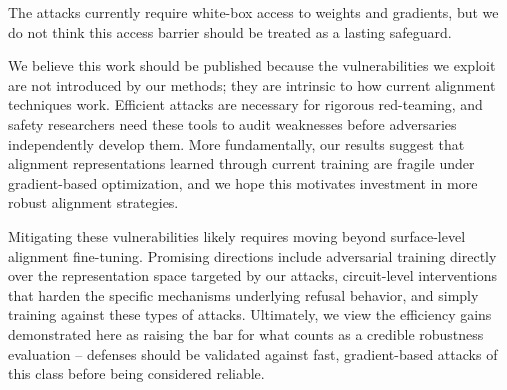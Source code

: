 \documentclass[letterpaper]{article} %
\begin{document}
The attacks currently require white-box access to weights and gradients, but we do not think this access barrier should be treated as a lasting safeguard.

We believe this work should be published because the vulnerabilities we exploit are not introduced by our methods; they are intrinsic to how current alignment techniques work. Efficient attacks are necessary for rigorous red-teaming, and safety researchers need these tools to audit weaknesses before adversaries independently develop them. More fundamentally, our results suggest that alignment representations learned through current training are fragile under gradient-based optimization, and we hope this motivates investment in more robust alignment strategies.

Mitigating these vulnerabilities likely requires moving beyond surface-level alignment fine-tuning. Promising directions include adversarial training directly over the representation space targeted by our attacks, circuit-level interventions that harden the specific mechanisms underlying refusal behavior, and simply training against these types of attacks. Ultimately, we view the efficiency gains demonstrated here as raising the bar for what counts as a credible robustness evaluation -- defenses should be validated against fast, gradient-based attacks of this class before being considered reliable.


\end{document}
